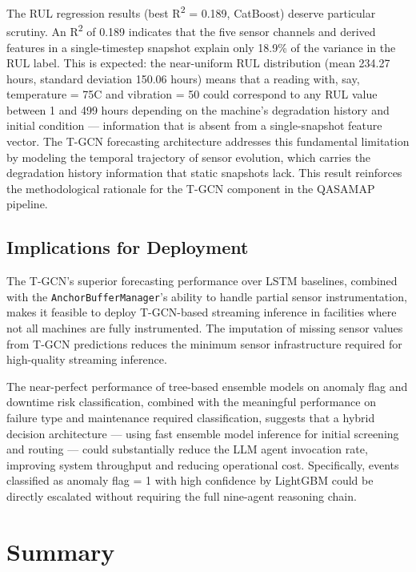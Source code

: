 The RUL regression results (best R\textsuperscript{2} = 0.189, CatBoost) deserve particular scrutiny. An R\textsuperscript{2} of 0.189 indicates that the five sensor channels and derived features in a single-timestep snapshot explain only 18.9\% of the variance in the RUL label. This is expected: the near-uniform RUL distribution (mean 234.27 hours, standard deviation 150.06 hours) means that a reading with, say, temperature = 75\textdegree C and vibration = 50 could correspond to any RUL value between 1 and 499 hours depending on the machine's degradation history and initial condition --- information that is absent from a single-snapshot feature vector. The T-GCN forecasting architecture addresses this fundamental limitation by modeling the temporal trajectory of sensor evolution, which carries the degradation history information that static snapshots lack. This result reinforces the methodological rationale for the T-GCN component in the QASAMAP pipeline.

\subsection{Implications for Deployment}

The T-GCN's superior forecasting performance over LSTM baselines, combined with the \texttt{AnchorBufferManager}'s ability to handle partial sensor instrumentation, makes it feasible to deploy T-GCN-based streaming inference in facilities where not all machines are fully instrumented. The imputation of missing sensor values from T-GCN predictions reduces the minimum sensor infrastructure required for high-quality streaming inference.

The near-perfect performance of tree-based ensemble models on anomaly flag and downtime risk classification, combined with the meaningful performance on failure type and maintenance required classification, suggests that a hybrid decision architecture --- using fast ensemble model inference for initial screening and routing --- could substantially reduce the LLM agent invocation rate, improving system throughput and reducing operational cost. Specifically, events classified as anomaly flag = 1 with high confidence by LightGBM could be directly escalated without requiring the full nine-agent reasoning chain.


\section{Summary}

